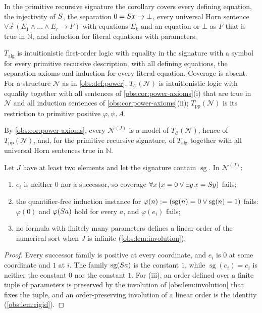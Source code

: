 In the primitive recursive signature the corollary covers every defining
equation, the injectivity of $S$, the separation $0=S x\to\bot$, every
universal Horn sentence
$\forall\vec x\,(E_1\wedge\dots\wedge E_r\to F)$ with equations $E_k$ and an
equation or $\bot$ as $F$ that is true in $\mathbb{N}$, and induction for
literal equations with parameters.

\begin{definition}
\label{obs:def:Talg}
$T_{\mathrm{alg}}$ is intuitionistic first-order logic with equality in the
signature with a symbol for every primitive recursive description, with all
defining equations, the separation axioms and induction for every literal
equation. Coverage is absent. For a structure $\mathcal{N}$ as in
\cref{obs:def:power}, $T_{\mathcal{C}}(\mathcal{N})$ is intuitionistic logic
with equality together with all sentences of
\cref{obs:cor:power-axioms}(i) that are true in $\mathcal{N}$ and all
induction sentences of \cref{obs:cor:power-axioms}(ii);
$T_{\mathrm{pp}}(\mathcal{N})$ is its restriction to primitive positive
$\varphi,\psi,A$.
\end{definition}

By \cref{obs:cor:power-axioms}, every $\mathcal{N}^{(J)}$ is a model of
$T_{\mathcal{C}}(\mathcal{N})$, hence of $T_{\mathrm{pp}}(\mathcal{N})$, and,
for the primitive recursive signature, of $T_{\mathrm{alg}}$ together with all
universal Horn sentences true in $\mathbb{N}$.

\begin{proposition}
\label{obs:prop:coverage-fails}
Let $J$ have at least two elements and let the signature contain
$\operatorname{sg}$. In $\mathcal{N}^{(J)}$:
\begin{enumerate}[label=(\roman*)]
\item $e_i$ is neither $0$ nor a successor, so coverage
$\forall x\,(x=0\vee\exists y\,x=S y)$ fails;
\item the quantifier-free induction instance for
$\varphi(n)\mathrel{:=}(\operatorname{sg}(n)=0\vee\operatorname{sg}(n)=1)$ fails:
$\varphi(0)$ and $\varphi(S a)$ hold for every $a$, and $\varphi(e_i)$
fails;
\item no formula with finitely many parameters defines a linear order of the
numerical sort when $J$ is infinite (\cref{obs:lem:involution}).
\end{enumerate}
\end{proposition}

\begin{proof}
Every successor family is positive at every coordinate, and $e_i$ is $0$ at
some coordinate and $1$ at $i$. The family $\operatorname{sg}(S a)$ is the
constant $1$, while $\operatorname{sg}(e_i)=e_i$ is neither the constant $0$
nor the constant $1$. For (iii), an order defined over a finite tuple of
parameters is preserved by the involution of \cref{obs:lem:involution} that
fixes the tuple, and an order-preserving involution of a linear order is the
identity (\cref{obs:lem:rigid}).
\end{proof}


